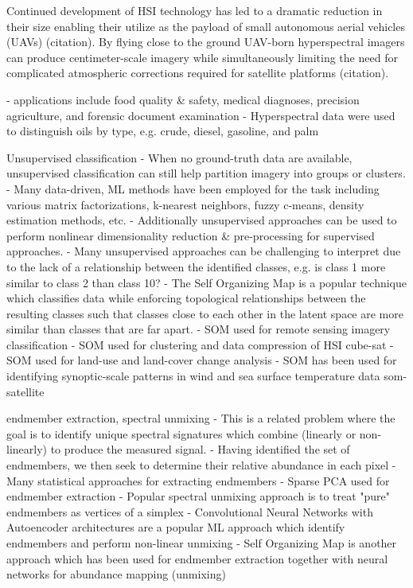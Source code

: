 \documentclass{article}
\begin{document}
Continued development of HSI technology has led to a dramatic reduction in their size enabling their utilize as the payload of small autonomous aerial vehicles (UAVs) (citation). By flying close to the ground UAV-born hyperspectral imagers can produce centimeter-scale imagery while simultaneously limiting the need for complicated atmospheric corrections required for satellite platforms (citation).

- applications include food quality & safety, medical diagnoses, precision agriculture, and forensic document examination \cite{khan2018modern}
- Hyperspectral data were used to distinguish oils by type, e.g. crude, diesel, gasoline, and palm \cite{yang2020characterization}


Unsupervised classification
- When no ground-truth data are available, unsupervised classification can still help partition imagery into groups or clusters.
- Many data-driven, ML methods have been employed for the task including various matrix factorizations, k-nearest neighbors, fuzzy c-means, density estimation methods, etc. \cite{zhang2019hyperspectral}
- Additionally unsupervised approaches can be used to perform nonlinear dimensionality reduction & pre-processing for supervised approaches.
- Many unsupervised approaches can be challenging to interpret due to the lack of a relationship between the identified classes, e.g. is class 1 more similar to class 2 than class 10?
- The Self Organizing Map is a popular technique which classifies data while enforcing topological relationships between the resulting classes such that classes close to each  other in the latent space are more similar than classes that are far apart.
- SOM used for remote sensing imagery classification \cite{msom-remote-sensing}
- SOM used for clustering and data compression of HSI cube-sat \cite{danielsen2021self}
- SOM used for land-use and land-cover change analysis \cite{penfound2021analysis}
- SOM has been used for identifying synoptic-scale patterns in wind and sea surface temperature data {som-satellite}


endmember extraction, spectral unmixing
- This is a related problem where the goal is to identify unique spectral signatures which combine (linearly or non-linearly) to produce the measured signal.
- Having identified the set of endmembers, we then seek to determine their relative abundance in each pixel
- Many statistical approaches for extracting endmembers \cite{berman2004ice}
- Sparse PCA used for endmember extraction \cite{yousefi2016mineral}
- Popular spectral unmixing approach is to treat "pure" endmembers as vertices of a simplex \cite{plaza2012endmember, nascimento2005vertex}
- Convolutional Neural Networks with Autoencoder architectures are a popular ML approach which identify endmembers and perform non-linear unmixing \cite{palsson2020convolutional, non-negative-autoencoders, su2019daen, borsoi2019deep}
- Self Organizing Map is another approach which has been used for endmember extraction together with neural networks for abundance mapping (unmixing) \cite{cantero2004analysis}
\end{document}
